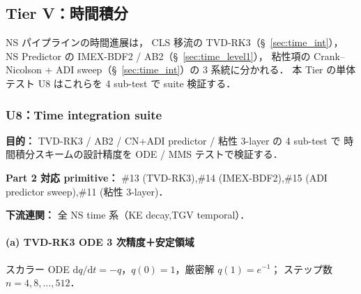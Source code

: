 %
\subsection{Tier V：時間積分}
\label{sec:verify_time}

NS パイプラインの時間進展は，
CLS 移流の TVD-RK3（§~\ref{sec:time_int}），
NS Predictor の IMEX-BDF2 / AB2（§~\ref{sec:time_level1}），
粘性項の Crank--Nicolson + ADI sweep（§~\ref{sec:time_int}）の
3 系統に分かれる．
本 Tier の単体テスト U8 はこれらを 4 sub-test で suite 検証する．

\subsubsection{U8：Time integration suite}
\label{sec:U8_time_integration_suite}

\noindent\textbf{目的：}
TVD-RK3 / AB2 / CN+ADI predictor / 粘性 3-layer の 4 sub-test で
時間積分スキームの設計精度を ODE / MMS テストで検証する．

\noindent\textbf{Part 2 対応 primitive：}
\#13 (TVD-RK3),\#14 (IMEX-BDF2),\#15 (ADI predictor sweep),\#11 (粘性 3-layer)．

\noindent\textbf{下流連関：}
全 NS time 系（KE decay,TGV temporal）．

\paragraph{(a) TVD-RK3 ODE 3 次精度＋安定領域}
\label{sec:verify_tvd_rk3}

スカラー ODE $\mathrm{d}q/\mathrm{d}t = -q$，$q(0) = 1$，厳密解 $q(1) = e^{-1}$；
ステップ数 $n = 4, 8, \ldots, 512$．

